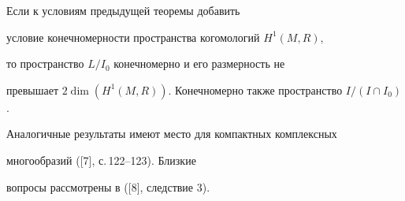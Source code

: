  


\begin{cors} 


Если к условиям предыдущей теоремы добавить 


условие конечномерности пространства когомологий $H^1(M,R)$, 


то пространство $L/I_0$ конечномерно и его размерность не 


превышает $2\dim(H^1(M,R))$. Конечномерно также пространство $I/(I\cap 


I_0)$. 


\end{cors} 


 


 


Аналогичные результаты имеют место для компактных комплексных 


многообразий ([7], с.\,122--123). Близкие 


вопросы рассмотрены в ([8], следствие 3). 


 


